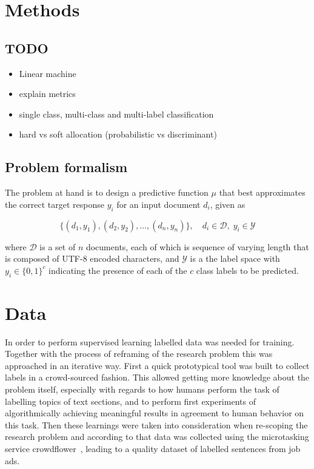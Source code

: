 
\clearpage
\section{Methods}

\subsection{TODO}

\begin{itemize}
  \item Linear machine
  \item explain metrics
  \item single class, multi-class and multi-label classification
  \item hard vs soft allocation (probabilistic vs discriminant)
\end{itemize}

\subsection{Problem formalism}

The problem at hand is to design a predictive function $\mu$ that best approximates the correct target response $y_i$ for an input document $d_i$, given as

\begin{equation}
  \{ (d_1, y_1), (d_2, y_2), \ldots, (d_n, y_n) \}, \quad d_i \in \mathcal{D}, \; y_i \in \mathcal{Y}
\end{equation}

where $\mathcal{D}$ is a set of $n$ documents, each of which is sequence of varying length that is composed of UTF-8 encoded characters, and $\mathcal{Y}$ is a the label space with $y_i \in \{0, 1\}^{c}$ indicating the presence of each of the $c$ class labels to be predicted.

\section{Data}


In order to perform supervised learning labelled data was needed for training. Together with the process of reframing of the research problem this was approached in an iterative way. First a quick prototypical tool was built to collect labels in a crowd-sourced fashion. This allowed getting more knowledge about the problem itself, especially with regards to how humans perform the task of labelling topics of text sections, and to perform first experiments of algorithmically achieving meaningful results in agreement to human behavior on this task. Then these learnings were taken into consideration when re-scoping the research problem and according to that data was collected using the microtasking service crowdflower~\cite{crowdflower}, leading to a quality dataset of labelled sentences from job ads.


